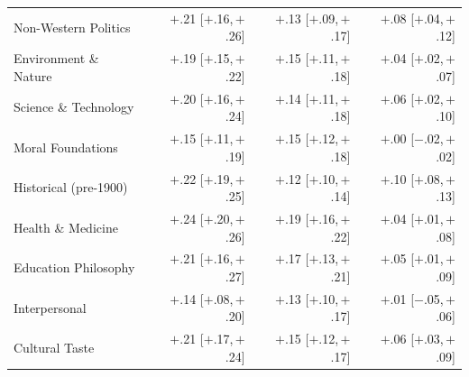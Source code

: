 \begin{table}[h]
\begin{tabular}{l r r r}
Non-Western Politics & $+$.21 \scriptsize{[$+$.16,\,$+$.26]} & $+$.13 \scriptsize{[$+$.09,\,$+$.17]} & $+$.08 \scriptsize{[$+$.04,\,$+$.12]} \\
Environment \& Nature & $+$.19 \scriptsize{[$+$.15,\,$+$.22]} & $+$.15 \scriptsize{[$+$.11,\,$+$.18]} & $+$.04 \scriptsize{[$+$.02,\,$+$.07]} \\
Science \& Technology & $+$.20 \scriptsize{[$+$.16,\,$+$.24]} & $+$.14 \scriptsize{[$+$.11,\,$+$.18]} & $+$.06 \scriptsize{[$+$.02,\,$+$.10]} \\
Moral Foundations & $+$.15 \scriptsize{[$+$.11,\,$+$.19]} & $+$.15 \scriptsize{[$+$.12,\,$+$.18]} & $+$.00 \scriptsize{[$-$.02,\,$+$.02]} \\
Historical (pre-1900) & $+$.22 \scriptsize{[$+$.19,\,$+$.25]} & $+$.12 \scriptsize{[$+$.10,\,$+$.14]} & $+$.10 \scriptsize{[$+$.08,\,$+$.13]} \\
Health \& Medicine & $+$.24 \scriptsize{[$+$.20,\,$+$.26]} & $+$.19 \scriptsize{[$+$.16,\,$+$.22]} & $+$.04 \scriptsize{[$+$.01,\,$+$.08]} \\
Education Philosophy & $+$.21 \scriptsize{[$+$.16,\,$+$.27]} & $+$.17 \scriptsize{[$+$.13,\,$+$.21]} & $+$.05 \scriptsize{[$+$.01,\,$+$.09]} \\
Interpersonal & $+$.14 \scriptsize{[$+$.08,\,$+$.20]} & $+$.13 \scriptsize{[$+$.10,\,$+$.17]} & $+$.01 \scriptsize{[$-$.05,\,$+$.06]} \\
Cultural Taste & $+$.21 \scriptsize{[$+$.17,\,$+$.24]} & $+$.15 \scriptsize{[$+$.12,\,$+$.17]} & $+$.06 \scriptsize{[$+$.03,\,$+$.09]} \\
\bottomrule
\end{tabular}
\end{table}
